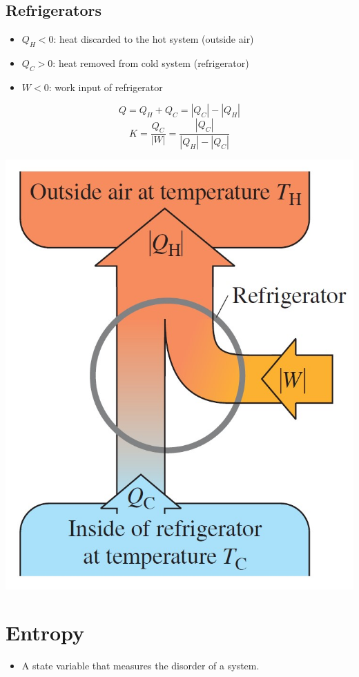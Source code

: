 \documentclass{article}
\begin{document}
\subsection{Refrigerators}
\begin{itemize}
    \item $Q_H<0$: heat discarded to the hot system (outside air)
    \item $Q_C>0$: heat removed from cold system (refrigerator)
    \item $W<0$: work input of refrigerator 
\end{itemize}
\[Q=Q_H+Q_C=|Q_C|-|Q_H|\]
\[K=\frac{Q_C}{|W|}=\frac{|Q_C|}{|Q_H|-|Q_C|}\]
\begin{center}
    \includegraphics[scale=0.25]{images/refrigerator_energy_flow.jpg}
\end{center}

\section{Entropy}
\begin{itemize}
    \item A state variable that measures the disorder of a system. 
\end{itemize}
\end{document}
